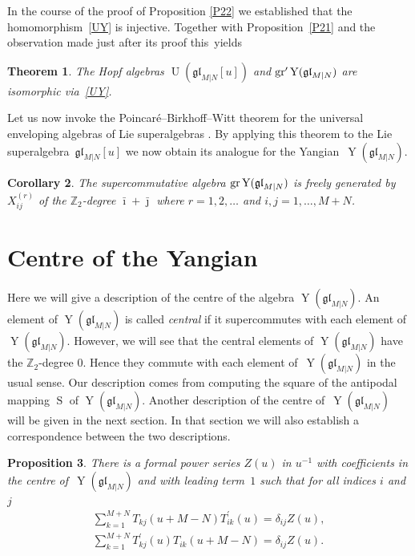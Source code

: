 \documentclass[pdftex]{sigma}
\numberwithin{equation}{section}
\newtheorem{Theorem}{Theorem}[section]
\newtheorem{Corollary}[Theorem]{Corollary}
\newtheorem{Proposition}[Theorem]{Proposition}
\def\bi{{\bar\imath }}
\def\bj{{\bar\jmath }}
\def\g{\glMN [u]}
\def\glMN{\mathfrak{gl}_{M|N}}
\def\gr{{\rm gr} }
\def\grpr{{\rm gr}^{\prime} }
\def\S{\operatorname{S}}
\def\TP{T^{\prime}}
\def\Ug{\operatorname{U}(\g)}
\def\YMN{\operatorname{Y}(\glMN)}
\def\ZZ{\mathbb{Z}}
\begin{document}
In the course of the proof of Proposition \ref{P22} we established that
the homomorphism~\eqref{UY} is injective.
Together with Proposition~\ref{P21}
and the observation made just after its proof this~yields

\begin{Theorem}\label{T18}The Hopf algebras $\Ug$ and $\grpr\YMN$ are isomorphic via~\eqref{UY}.
\end{Theorem}

Let us now invoke the Poincar\'e--Birkhoff--Witt theorem for the universal
enveloping algebras of Lie superalgebras \cite[Theorem~5.15]{MM}.
By applying this theorem to
the Lie superalgebra~$\g$ we now obtain its analogue
for the Yangian~$\YMN $.

\begin{Corollary}The supercommutative algebra $\gr\YMN$ is freely generated
by $X_{ij}^{(r)}$ of the $\ZZ_2$-degree $\bi+\bj$
where $r=1 ,2 , \dots$ and $i ,j=1 ,\dots, M+N $.
\end{Corollary}

\section{Centre of the Yangian}\label{sec:2}

Here we will give a description of the centre of the
algebra $\YMN $. An element of $\YMN$ is called
\emph {central} if it supercommutes with each element of $\YMN $.
However, we will see that the central elements of $\YMN$ have
the $\ZZ_{2}$-degree $0 $.
Hence they commute with each
element of~$\YMN$ in the usual sense.
Our description comes from computing the square of the antipodal mapping $\S$ of $\YMN $.
Another description of the centre of~$\YMN $ will be
given in the next section. In that section we will also establish a
correspondence between the two descriptions.

\begin{Proposition}\label{zu} There is a formal power series $Z(u)$ in $u^{-1}$ with coefficients in
the centre of~$\YMN$ and with
leading term~$1$ such that for all indices $i$ and $j$
\begin{gather}\label{zetav}
\sum_{k=1}^{M+N}T_{kj}(u+M-N) \TP_{ik}(u) =\delta_{ij} Z(u) ,\\
\label{zetau}
\sum_{k=1}^{M+N}
\TP_{kj}(u) T_{ik}(u+M-N) =\delta_{ij} Z(u) .
\end{gather}
\end{Proposition}
\end{document}
